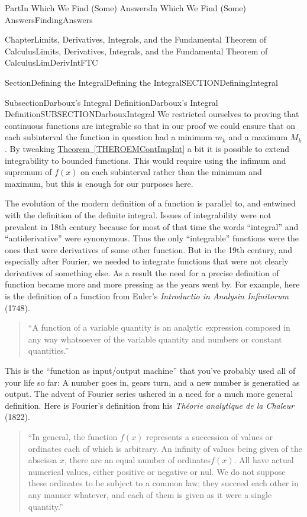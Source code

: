 \documentclass[oneside,10pt,]{book}
\newcommand{\xreffont}{\relax}
\newcommand{\pubtitle}[1]{\textsl{#1}}
\numberwithin{equation}{part}
\begin{document}
\begin{partptx}{Part}{In Which We Find (Some) Answers}{}{In Which We Find (Some) Answers}{}{}{FindingAnswers}
\begin{chapterptx}{Chapter}{Limits, Derivatives, Integrals, and the Fundamental Theorem of Calculus}{}{Limits, Derivatives, Integrals, and the Fundamental Theorem of Calculus}{}{}{LimDerivIntFTC}
\begin{sectionptx}{Section}{Defining the Integral}{}{Defining the Integral}{}{}{SECTIONDefiningIntegral}
\begin{subsectionptx}{Subsection}{Darboux's Integral Definition}{}{Darboux's Integral Definition}{}{}{SUBSECTIONDarbouxIntegral}
We restricted ourselves to proving that continuous functions are integrable so that in our proof we could ensure that on each subinterval the function in question had a minimum \(m_k\) and a maximum \(M_k\).  By tweaking \hyperref[THEROEMContImpInt]{Theorem~{\xreffont\ref{THEROEMContImpInt}}} a bit it is possible to extend integrability to bounded functions. This would require using the infimum and supremum of \(f(x)\) on each subinterval rather than the minimum and maximum, but this is enough for our purposes here.%
\par
The evolution of the modern definition of a function is parallel to, and entwined with the definition of the definite integral.  Issues of integrability were not prevalent in 18th century because for most of that time the words ``integral'' and ``antiderivative'' were synonymous. Thus the only ``integrable'' functions were the ones that were derivatives of some other function. But in the 19th century, and especially after Fourier, we needed to integrate functions that were not clearly derivatives of something else. As a result the need for a precise definition of function became more and more pressing as the years went by.  For example, here is the definition of a function from Euler's \pubtitle{\textit{Introductio in Analysin Infinitorum}} (1748).%
\begin{quote}%
``A function of a variable quantity is an analytic expression composed in any way whatsoever of the variable quantity and numbers or constant quantities.''%
\end{quote}
This is the ``function as input\slash{}output machine'' that you've probably used all of your life so far: A number goes in, gears turn, and a new number is generatied as output. The advent of  Fourier series ushered in a need for a much more general definition. Here is Fourier's definition from his \pubtitle{\textit{Théorie analytique de la Chaleur}} (1822).%
\begin{quote}%
``In general, the function \(f(x)\) represents a succession of values or ordinates each of which is arbitrary. An infinity of values being given of the abscissa \(x\), there are an equal number of ordinates\(f(x)\). All have actual numerical values, either positive or negative or nul. We do not suppose these ordinates to be subject to a common law; they succeed each other in any manner whatever, and each of them is given as it were a single quantity.''%
\end{quote}

\end{subsectionptx}
\end{sectionptx}
\end{chapterptx}
\end{partptx}
\end{document}
